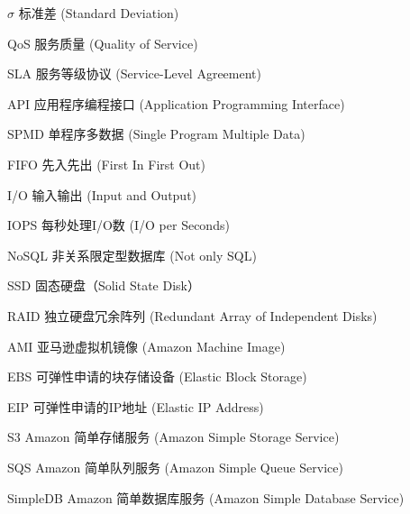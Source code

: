\begin{denotation}[3cm]
\item[$\sigma$] 标准差 (Standard Deviation)
\item[QoS] 服务质量 (Quality of Service)
\item[SLA] 服务等级协议 (Service-Level Agreement)
\item[API] 应用程序编程接口 (Application Programming Interface)
\item[SPMD] 单程序多数据 (Single Program Multiple Data)
\item[FIFO] 先入先出 (First In First Out)
\item[I/O] 输入输出 (Input and Output)
\item[IOPS] 每秒处理I/O数 (I/O per Seconds)
\item[NoSQL] 非关系限定型数据库 (Not only SQL)
\item[SSD] 固态硬盘（Solid State Disk）
\item[RAID] 独立硬盘冗余阵列 (Redundant Array of Independent Disks)
\item[AMI] 亚马逊虚拟机镜像 (Amazon Machine Image)
\item[EBS] 可弹性申请的块存储设备 (Elastic Block Storage)
\item[EIP] 可弹性申请的IP地址 (Elastic IP Address)
\item[S3] Amazon 简单存储服务 (Amazon Simple Storage Service)
\item[SQS] Amazon 简单队列服务 (Amazon Simple Queue Service)
\item[SimpleDB] Amazon 简单数据库服务 (Amazon Simple Database Service)
\end{denotation}
